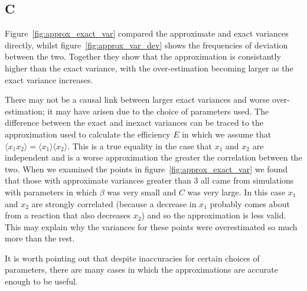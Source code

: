 \documentclass[a4paper,12pt]{article}
\begin{document}
\subsection*{C}
Figure~\ref{fig:approx_exact_var} compared the approximate and exact variances directly, whilst figure~\ref{fig:approx_var_dev} shows the frequencies of deviation between the two. Together they show that the approximation is consistantly higher than the exact variance, with the over-estimation becoming larger as the exact variance increases. 

There may not be a causal link between larger exact variances and worse over-estimation; it may have arisen due to the choice of parameters used. The difference between the exact and inexact variances can be traced to the approximation used to calculate the efficiency $E$ in which we assume that $\langle x_1 x_2 \rangle = \langle x_1 \rangle \langle x_2 \rangle$. This is a true equality in the case that $x_1$ and $x_2$ are independent and is a worse approximation the greater the correlation between the two. When we examined the points in figure~\ref{fig:approx_exact_var} we found that those with approximate variances greater than $3$ all came from simulations with parameters in which $\beta$ was very small and $C$ was very large. In this case $x_1$ and $x_2$ are strongly correlated (because a decrease in $x_1$ probably comes about from a reaction that also decreases $x_2$) and so the approximation is less valid. This may explain why the variances for these points were overestimated so much more than the rest.

It is worth pointing out that despite inaccuracies for certain choices of parameters, there are many cases in which the approximations are accurate enough to be useful.
\end{document}
